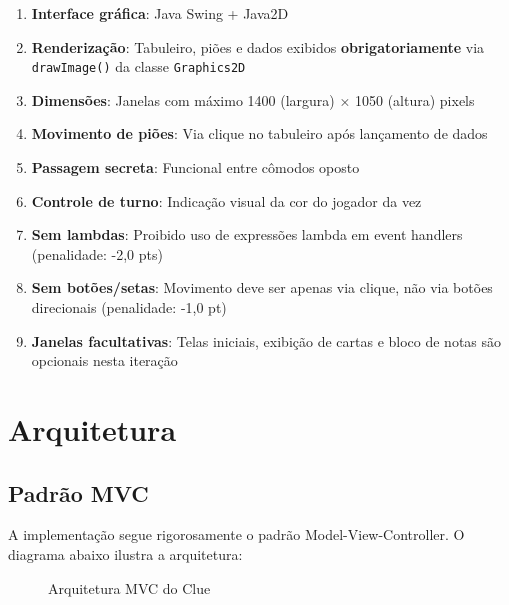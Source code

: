 \documentclass[12pt,a4paper]{report}
\begin{document}
\begin{enumerate}
    \item \textbf{Interface gráfica}: Java Swing + Java2D
    \item \textbf{Renderização}: Tabuleiro, piões e dados exibidos \textbf{obrigatoriamente} via \texttt{drawImage()} da classe \texttt{Graphics2D}
    \item \textbf{Dimensões}: Janelas com máximo 1400 (largura) × 1050 (altura) pixels
    \item \textbf{Movimento de piões}: Via clique no tabuleiro após lançamento de dados
    \item \textbf{Passagem secreta}: Funcional entre cômodos oposto
    \item \textbf{Controle de turno}: Indicação visual da cor do jogador da vez
    \item \textbf{Sem lambdas}: Proibido uso de expressões lambda em event handlers (penalidade: -2,0 pts)
    \item \textbf{Sem botões/setas}: Movimento deve ser apenas via clique, não via botões direcionais (penalidade: -1,0 pt)
    \item \textbf{Janelas facultativas}: Telas iniciais, exibição de cartas e bloco de notas são opcionais nesta iteração
\end{enumerate}

\chapter{Arquitetura}

\section{Padrão MVC}

A implementação segue rigorosamente o padrão Model-View-Controller. O diagrama abaixo ilustra a arquitetura:

\begin{figure}[H]
\centering
{}
\caption{Arquitetura MVC do Clue}
\label{fig:mvc}
\end{figure}
\end{document}
